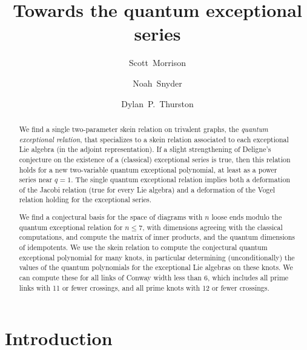 \documentclass[12pt]{amsart}
\begin{document}
\title{Towards the quantum exceptional series}

\author[Morrison]{Scott~Morrison}
\address{Mathematical Sciences Institute, Australian National University}

\author[Snyder]{Noah~Snyder}
\address{Bloomington, Indiana, USA}

\author[Thurston]{Dylan~P.~Thurston}
\address{Bloomington, Indiana, USA}

\begin{abstract}
  We find a single two-parameter skein relation on trivalent graphs,
  the \emph{quantum exceptional relation}, that specializes to a skein
  relation associated to each exceptional Lie algebra (in the adjoint
  representation). If a slight
  strengthening of Deligne's conjecture on the existence of a
  (classical) exceptional series is true, then this relation
  holds for a new two-variable quantum exceptional polynomial, at
  least as a power series near $q=1$. The
  single quantum exceptional relation implies both a deformation of the
  Jacobi relation (true for every Lie algebra) and
 a deformation of the Vogel relation holding for the exceptional series.

  We find a conjectural basis for the space of diagrams with $n$ loose
  ends modulo the quantum exceptional relation for $n \le 7$, with
  dimensions agreeing with the classical computations, and compute
  the matrix of inner products, and the quantum dimensions of idempotents.
  We use the
  skein relation to compute the conjectural quantum exceptional
  polynomial for many knots, in particular
  determining (unconditionally) the values of the quantum polynomials
  for the exceptional Lie algebras on
  these knots. We can compute these for all links of Conway width less 
  than $6$, which includes all prime links with 11 or fewer crossings, and 
  all prime knots with 12 or fewer crossings.
\end{abstract}


\maketitle
{ \hypersetup{linkcolor=black}
  \tableofcontents }

\section{Introduction}
\label{sec:introduction}
\end{document}
